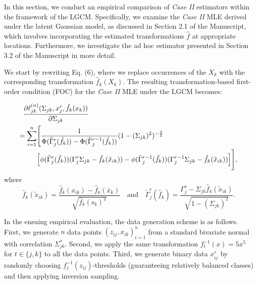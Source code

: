 \begin{change}
    In this section, we conduct an empirical comparison of \textit{Case II} estimators within the framework of the LGCM. Specifically, we examine the \textit{Case II} MLE derived under the latent Gaussian model, as discussed in Section 2.1 of the Manuscript, which involves incorporating the estimated transformations \(\hat{f}\) at appropriate locations. Furthermore, we investigate the ad hoc estimator presented in Section 3.2 of the Manuscript in more detail.

    We start by rewriting Eq. (6), where we replace occurrences of the $X_k$ with the corresponding transformation $\hat{f}_k(X_k)$. The resulting transformation-based first-order condition (FOC) for the \textit{Case II} MLE under the LGCM becomes:

    \begin{align*}
        \MoveEqLeft \frac{\partial\ell_{jk}^{(n)}(\Sigma_{jk}, x_j^r,\hat{f_k}(x_k))}{\partial \Sigma_{jk}}                                                                                                                                 \\
        = \sum_{i=1}^n & \Bigg[\frac{1}{\Phi(\tilde{\Gamma}_j^{r}(\hat{f_k})) - \Phi(\tilde{\Gamma}_j^{r-1}(\hat{f_k}))}(1-(\Sigma_{jk})^2)^{-\frac{3}{2}}                                                                                  \\
                       & \Big[\phi({\tilde{\Gamma}}_j^{r}(\hat{f_k}))({\Gamma}_j^r\Sigma_{jk} - \hat{f_k}(\tilde{x}_{ik})) - \phi({\tilde{\Gamma}}_j^{r-1}(\hat{f_k}))({\Gamma}_j^{r-1}\Sigma_{jk} - \hat{f_k}(\tilde{x}_{ik}))\Big]\Bigg],
    \end{align*}
    where
    \[\hat{f}_k(\tilde{x}_{ik}) = \frac{\hat{f}_k(x_{ik}) - \hat{f}_k(\bar{x}_k)}{\sqrt{\hat{f}_k(s_k)^2}} \quad \text{and} \quad {\tilde{\Gamma}}_j^{r}(\hat{f}_k) = \frac{{\Gamma}_j^{r} - \Sigma_{jk}\hat{f}_k(\tilde{x}_{ik})}{\sqrt{1-(\Sigma_{jk})^2}}.\]

    In the ensuing empirical evaluation, the data generation scheme is as follows. First, we generate \(n\) data points \((z_{ij}, x_{ik})_{i=1}^n\) from a standard bivariate normal with correlation \(\Sigma^*_{jk}\). Second, we apply the same transformation \(f_t^{-1}(x) = 5x^5\) for \(t \in \{j,k\}\) to all the data points. Third, we generate binary data \(x_{ij}^r\) by randomly choosing \(f^{-1}_j(z_{ij})\)-thresholds (guaranteeing relatively balanced classes) and then applying inversion sampling.


\end{change}

